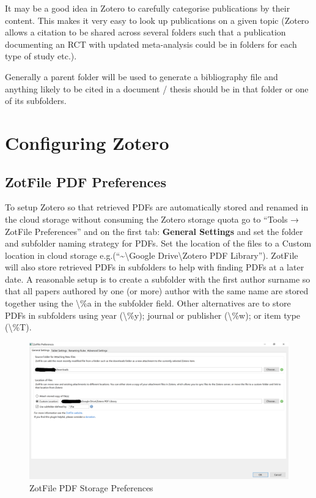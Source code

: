 \documentclass[
]{book}
\begin{document}
It may be a good idea in Zotero to carefully categorise publications by their content. This makes it very easy to look up publications on a given topic (Zotero allows a citation to be shared across several folders such that a publication documenting an RCT with updated meta-analysis could be in folders for each type of study etc.).

Generally a parent folder will be used to generate a bibliography file and anything likely to be cited in a document / thesis should be in that folder or one of its subfolders.

\hypertarget{configuring-zotero}{%
\section{Configuring Zotero}\label{configuring-zotero}}

\hypertarget{zotfile-pdf-preferences}{%
\subsection{ZotFile PDF Preferences}\label{zotfile-pdf-preferences}}

To setup Zotero so that retrieved PDFs are automatically stored and renamed in the cloud storage without consuming the Zotero storage quota go to ``Tools → ZotFile Preferences'' and on the first tab: \textbf{General Settings} and set the folder and subfolder naming strategy for PDFs. Set the location of the files to a Custom location in cloud storage e.g.(``\textasciitilde\textbackslash Google Drive\textbackslash Zotero PDF Library''). ZotFile will also store retrieved PDFs in subfolders to help with finding PDFs at a later date. A reasonable setup is to create a subfolder with the first author surname so that all papers authored by one (or more) author with the same name are stored together using the \textbackslash\%a in the subfolder field. Other alternatives are to store PDFs in subfolders using year (\textbackslash\%y); journal or publisher (\textbackslash\%w); or item type (\textbackslash\%T).

\begin{figure}
\includegraphics[width=44.44in]{img/zotfile_preferences} \caption{ZotFile PDF Storage Preferences}\label{fig:zotfile-preferences}
\end{figure}
\end{document}
